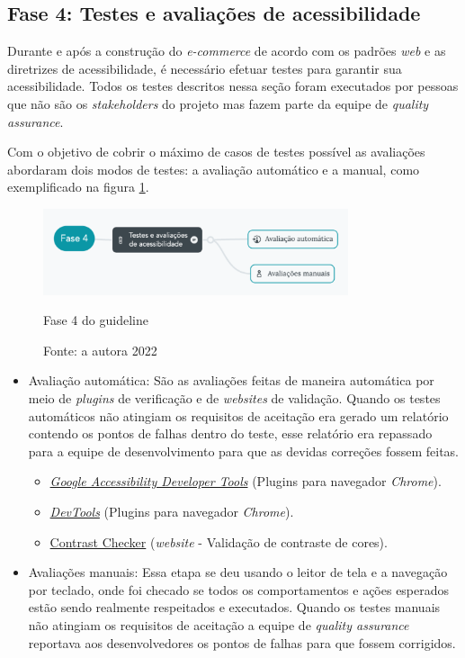\subsection{Fase 4: Testes e avaliações de acessibilidade}
{Durante e após a construção do \textit{e-commerce} de acordo com os
padrões \textit{web} e as diretrizes de acessibilidade, é necessário efetuar testes para garantir sua acessibilidade. Todos os testes descritos nessa seção foram executados por pessoas que não são os \textit{stakeholders} do projeto mas fazem parte da equipe de \textit{quality assurance}. 

Com o objetivo de cobrir o máximo de casos de testes possível as avaliações abordaram dois modos de testes: a avaliação automático e a manual, como exemplificado na figura \ref{guideline-f4}.

\begin{figure}[ht]
  	\center
    \includegraphics[width=0.8\textwidth]{images/guideline-f4.png}
    \caption{Fase 4 do guideline}
    \caption*{Fonte: a autora 2022}
    \label{guideline-f4}
\end{figure} 


\begin{itemize}
\item Avaliação automática: São as avaliações feitas de maneira automática por meio de \textit{plugins} de verificação e de \textit{websites} de validação. Quando os testes automáticos não atingiam os requisitos de aceitação era gerado um relatório contendo os pontos de falhas dentro do teste, esse relatório era repassado para a equipe de desenvolvimento para que as devidas correções fossem feitas.
\begin{itemize}
    \item \href{https://chrome.google.com/webstore/detail/accessibility-developer-t/fpkknkljclfencbdbgkenhalefipecmb?hl=pt-BR}{\textit{Google Accessibility Developer Tools}} ({Plugins} para navegador \textit{Chrome}).
    \item \href{https://developer.chrome.com/docs/devtools/}{\textit{DevTools}} ({Plugins} para navegador \textit{Chrome}).
    \item \href{https://contrastchecker.com/}{Contrast Checker} (\textit{website} - Validação de contraste de cores).
\end{itemize}
\item Avaliações manuais: Essa etapa se deu usando o leitor de tela e a navegação por teclado, onde foi checado se todos os comportamentos e ações esperados estão sendo realmente respeitados e executados. Quando os testes manuais não atingiam os requisitos de aceitação a equipe de \textit{quality assurance} reportava aos desenvolvedores os pontos de falhas para que fossem corrigidos.
\end{itemize}


}

